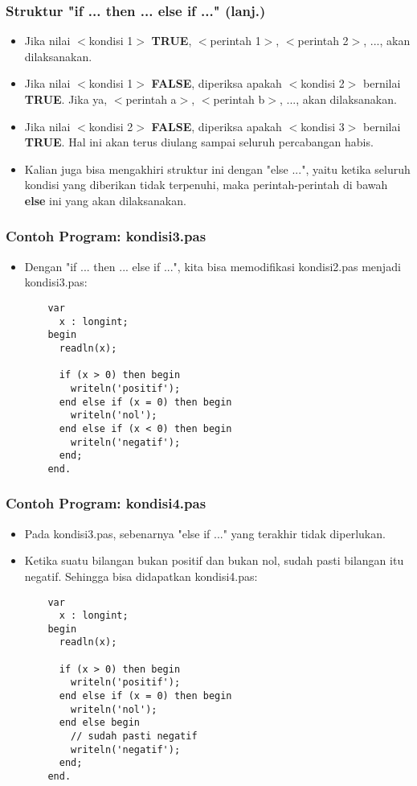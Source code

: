 \begin{frame}
\frametitle{Struktur "if ... then ... else if ..." (lanj.)}
\begin{itemize}
  \item Jika nilai $<$kondisi 1$>$ \textbf{TRUE}, $<$perintah 1$>$, $<$perintah 2$>$, ..., akan dilaksanakan.
  \item Jika nilai $<$kondisi 1$>$ \textbf{FALSE}, diperiksa apakah $<$kondisi 2$>$ bernilai \textbf{TRUE}. Jika ya, $<$perintah a$>$, $<$perintah b$>$, ..., akan dilaksanakan.
  \item Jika nilai $<$kondisi 2$>$ \textbf{FALSE}, diperiksa apakah $<$kondisi 3$>$ bernilai \textbf{TRUE}. Hal ini akan terus diulang sampai seluruh percabangan habis.
  \item Kalian juga bisa mengakhiri struktur ini dengan "else ...", yaitu ketika seluruh kondisi yang diberikan tidak terpenuhi, maka perintah-perintah di bawah \textbf{else} ini yang akan dilaksanakan.
\end{itemize}
\end{frame}

\begin{frame}[fragile]
\frametitle{Contoh Program: kondisi3.pas}
\begin{itemize}
  \item Dengan "if ... then ... else if ...", kita bisa memodifikasi kondisi2.pas menjadi kondisi3.pas:
  \begin{lstlisting}
    var
      x : longint;
    begin
      readln(x);

      if (x > 0) then begin
        writeln('positif');
      end else if (x = 0) then begin
        writeln('nol');
      end else if (x < 0) then begin
        writeln('negatif');
      end;
    end.
  \end{lstlisting}
\end{itemize}
\end{frame}

\begin{frame}[fragile]
\frametitle{Contoh Program: kondisi4.pas}
\begin{itemize}
  \item Pada kondisi3.pas, sebenarnya "else if ..." yang terakhir tidak diperlukan.
  \item Ketika suatu bilangan bukan positif dan bukan nol, sudah pasti bilangan itu negatif. Sehingga bisa didapatkan kondisi4.pas:
  \begin{lstlisting}
    var
      x : longint;
    begin
      readln(x);

      if (x > 0) then begin
        writeln('positif');
      end else if (x = 0) then begin
        writeln('nol');
      end else begin
        // sudah pasti negatif
        writeln('negatif');
      end;
    end.
  \end{lstlisting}
\end{itemize}
\end{frame}

